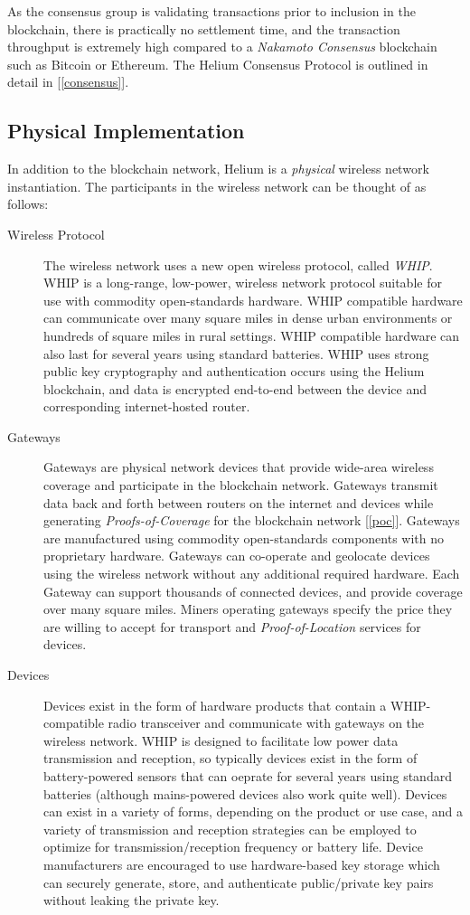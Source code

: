 \documentclass[10pt, nonatbib, nocopyrightspace, reprint]{sigplanconf}
\newcommand{\secref}[1]{[\autoref{#1}]}
\begin{document}
As the consensus group is validating transactions prior to inclusion in the blockchain, there is practically no settlement time, and the transaction throughput is extremely high compared to a \emph{Nakamoto Consensus} blockchain such as Bitcoin or Ethereum. The Helium Consensus Protocol is outlined in detail in \secref{consensus}.

\subsection{Physical Implementation}

In addition to the blockchain network, Helium is a \emph{physical} wireless network instantiation. The participants in the wireless network can be thought of as follows:

\begin{description}
    \item [Wireless Protocol] The wireless network uses a new open wireless protocol, called \emph{WHIP}. WHIP is a long-range, low-power, wireless network protocol suitable for use with commodity open-standards hardware. WHIP compatible hardware can communicate over many square miles in dense urban environments or hundreds of square miles in rural settings. WHIP compatible hardware can also last for several years using standard batteries. WHIP uses strong public key cryptography and authentication occurs using the Helium blockchain, and data is encrypted end-to-end between the device and corresponding internet-hosted router.

    \item [Gateways] Gateways are physical network devices that provide wide-area wireless coverage and participate in the blockchain network. Gateways transmit data back and forth between routers on the internet and devices while generating \emph{Proofs-of-Coverage} for the blockchain network \secref{poc}. Gateways are manufactured using commodity open-standards components with no proprietary hardware. Gateways can co-operate and geolocate devices using the wireless network without any additional required hardware. Each Gateway can support thousands of connected devices, and provide coverage over many square miles. Miners operating gateways specify the price they are willing to accept for transport and \emph{Proof-of-Location} services for devices.

    \item [Devices] Devices exist in the form of hardware products that contain a WHIP-compatible radio transceiver and communicate with gateways on the wireless network. WHIP is designed to facilitate low power data transmission and reception, so typically devices exist in the form of battery-powered sensors that can oeprate for several years using standard batteries (although mains-powered devices also work quite well). Devices can exist in a variety of forms, depending on the product or use case, and a variety of transmission and reception strategies can be employed to optimize for transmission/reception frequency or battery life. Device manufacturers are encouraged to use hardware-based key storage which can securely generate, store, and authenticate public/private key pairs without leaking the private key.
\end{description}
\end{document}
